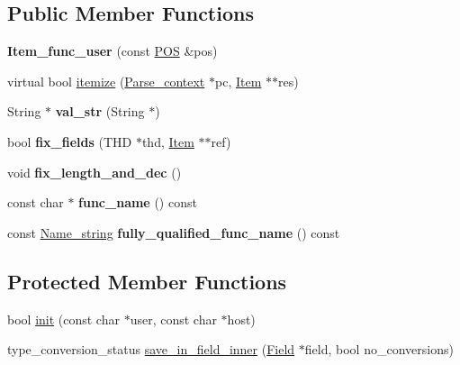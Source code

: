 \subsection*{Public Member Functions}
\begin{DoxyCompactItemize}
\item 
\mbox{\label{classItem__func__user_a0e24b8765d130c9947185f1a0ae1c475}} 
{\bfseries Item\+\_\+func\+\_\+user} (const \mbox{\hyperlink{structYYLTYPE}{P\+OS}} \&pos)
\item 
virtual bool \mbox{\hyperlink{classItem__func__user_a3e90c1dfcb5fc3007e8f77e9c3398f93}{itemize}} (\mbox{\hyperlink{structParse__context}{Parse\+\_\+context}} $\ast$pc, \mbox{\hyperlink{classItem}{Item}} $\ast$$\ast$res)
\item 
\mbox{\label{classItem__func__user_a343d92bc3e981adbea0ed7a36aaefae5}} 
String $\ast$ {\bfseries val\+\_\+str} (String $\ast$)
\item 
\mbox{\label{classItem__func__user_abd14ea4c0d48139491b4370e04f2d43e}} 
bool {\bfseries fix\+\_\+fields} (T\+HD $\ast$thd, \mbox{\hyperlink{classItem}{Item}} $\ast$$\ast$ref)
\item 
\mbox{\label{classItem__func__user_aac9fc1c5283ed475b318c77691a81642}} 
void {\bfseries fix\+\_\+length\+\_\+and\+\_\+dec} ()
\item 
\mbox{\label{classItem__func__user_a9334a09cfed80760241d5275ed6021ad}} 
const char $\ast$ {\bfseries func\+\_\+name} () const
\item 
\mbox{\label{classItem__func__user_a658c67f9e8707a736357b7beb85339f7}} 
const \mbox{\hyperlink{className__string}{Name\+\_\+string}} {\bfseries fully\+\_\+qualified\+\_\+func\+\_\+name} () const
\end{DoxyCompactItemize}
\subsection*{Protected Member Functions}
\begin{DoxyCompactItemize}
\item 
bool \mbox{\hyperlink{classItem__func__user_a11990f518a5f6a600dfc431ded3f0618}{init}} (const char $\ast$user, const char $\ast$host)
\item 
type\+\_\+conversion\+\_\+status \mbox{\hyperlink{classItem__func__user_af2a9b48879d2aa85545dfd4074510531}{save\+\_\+in\+\_\+field\+\_\+inner}} (\mbox{\hyperlink{classField}{Field}} $\ast$field, bool no\+\_\+conversions)
\end{DoxyCompactItemize}

